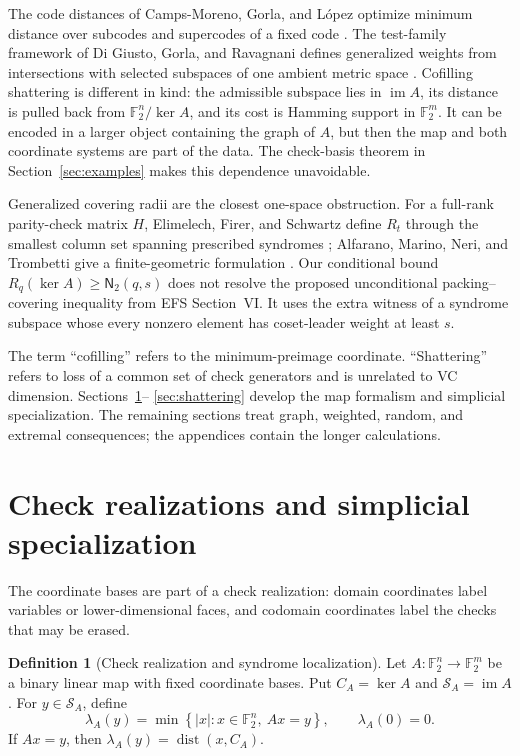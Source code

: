 \documentclass[11pt,letterpaper]{article}
\theoremstyle{plain}
\theoremstyle{definition}
\newtheorem{definition}[theorem]{Definition}
\newcommand{\F}{\mathbb{F}_2}
\newcommand{\cS}{\mathcal{S}}
\newcommand{\dist}{\operatorname{dist}}
\newcommand{\im}{\operatorname{im}}
\newcommand{\1}{\mathbf{1}}
\newcommand{\abs}[1]{\left|#1\right|}
\newcommand{\set}[1]{\left\{#1\right\}}
\begin{document}
The code distances of Camps-Moreno, Gorla, and L\'opez optimize minimum
distance over subcodes and supercodes of a fixed code \cite{campsmoreno2025}.
The test-family framework of Di Giusto, Gorla, and Ravagnani defines
generalized weights from intersections with selected subspaces of one ambient
metric space \cite{digiusto2025}.  Cofilling shattering is different in kind:
the admissible subspace lies in $\im A$, its distance is pulled back from
$\F^n/\ker A$, and its cost is Hamming support in $\F^m$.  It can be encoded
in a larger object containing the graph of $A$, but then the map and both
coordinate systems are part of the data.  The check-basis theorem in
Section~\ref{sec:examples} makes this dependence unavoidable.

Generalized covering radii are the closest one-space obstruction.  For a
full-rank parity-check matrix $H$, Elimelech, Firer, and Schwartz define
$R_t$ through the smallest column set spanning prescribed syndromes
\cite[Definition~1]{elimelech2021}; Alfarano, Marino, Neri, and Trombetti give
a finite-geometric formulation \cite{alfarano2026}.  Our conditional bound
$R_q(\ker A)\ge\mathsf N_2(q,s)$ does not resolve the proposed unconditional
packing--covering inequality from EFS Section~VI.  It uses the extra witness
of a syndrome subspace whose every nonzero element has coset-leader weight at
least $s$.

The term ``cofilling'' refers to the minimum-preimage coordinate.
``Shattering'' refers to loss of a common set of check generators and is
unrelated to VC dimension.  Sections~\ref{sec:preliminaries}--
\ref{sec:shattering} develop the map formalism and simplicial specialization.
The remaining sections treat graph, weighted, random, and extremal
consequences; the appendices contain the longer calculations.

\section{Check realizations and simplicial specialization}\label{sec:preliminaries}

The coordinate bases are part of a check realization: domain coordinates label
variables or lower-dimensional faces, and codomain coordinates label the checks that
may be erased.

\begin{definition}[Check realization and syndrome localization]
\label{def:check-realization}
Let $A:\F^n\to\F^m$ be a binary linear map with fixed coordinate bases.  Put
$C_A=\ker A$ and $\cS_A=\im A$.  For $y\in\cS_A$, define
\begin{equation}\label{eq:map-lambda}
 \lambda_A(y)=\min\set{\abs{x}:x\in\F^n,\ Ax=y},
 \qquad \lambda_A(0)=0.
\end{equation}
If $Ax=y$, then $\lambda_A(y)=\dist(x,C_A)$.
\end{definition}
\end{document}
